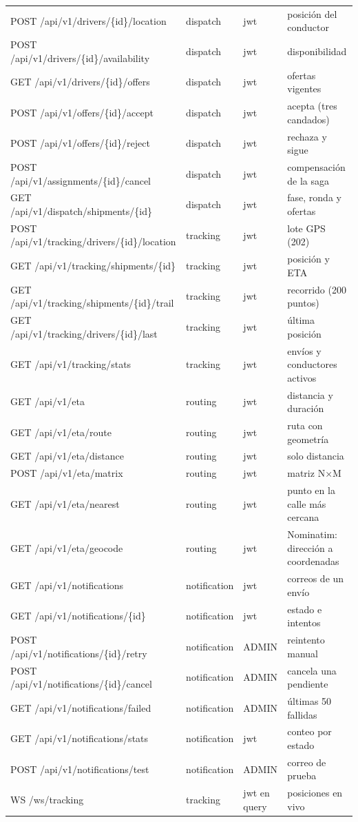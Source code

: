 \documentclass[conference]{IEEEtran}
\begin{document}
\begin{table}[!t]
\begin{tabular}{@{}L{6.4cm}L{2.2cm}L{1.6cm}L{5.2cm}@{}}
POST /api/v1/drivers/\{id\}/location & dispatch & jwt & posición del conductor\\
POST /api/v1/drivers/\{id\}/availability & dispatch & jwt & disponibilidad\\
GET /api/v1/drivers/\{id\}/offers & dispatch & jwt & ofertas vigentes\\
POST /api/v1/offers/\{id\}/accept & dispatch & jwt & acepta (tres candados)\\
POST /api/v1/offers/\{id\}/reject & dispatch & jwt & rechaza y sigue\\
POST /api/v1/assignments/\{id\}/cancel & dispatch & jwt & compensación de la saga\\
GET /api/v1/dispatch/shipments/\{id\} & dispatch & jwt & fase, ronda y ofertas\\
POST /api/v1/tracking/drivers/\{id\}/location & tracking & jwt & lote GPS (202)\\
GET /api/v1/tracking/shipments/\{id\} & tracking & jwt & posición y ETA\\
GET /api/v1/tracking/shipments/\{id\}/trail & tracking & jwt & recorrido (200 puntos)\\
GET /api/v1/tracking/drivers/\{id\}/last & tracking & jwt & última posición\\
GET /api/v1/tracking/stats & tracking & jwt & envíos y conductores activos\\
GET /api/v1/eta & routing & jwt & distancia y duración\\
GET /api/v1/eta/route & routing & jwt & ruta con geometría\\
GET /api/v1/eta/distance & routing & jwt & solo distancia\\
POST /api/v1/eta/matrix & routing & jwt & matriz N×M\\
GET /api/v1/eta/nearest & routing & jwt & punto en la calle más cercana\\
GET /api/v1/eta/geocode & routing & jwt & Nominatim: dirección a coordenadas\\
GET /api/v1/notifications & notification & jwt & correos de un envío\\
GET /api/v1/notifications/\{id\} & notification & jwt & estado e intentos\\
POST /api/v1/notifications/\{id\}/retry & notification & ADMIN & reintento manual\\
POST /api/v1/notifications/\{id\}/cancel & notification & ADMIN & cancela una pendiente\\
GET /api/v1/notifications/failed & notification & ADMIN & últimas 50 fallidas\\
GET /api/v1/notifications/stats & notification & jwt & conteo por estado\\
POST /api/v1/notifications/test & notification & ADMIN & correo de prueba\\
WS /ws/tracking & tracking & jwt en query & posiciones en vivo\\
\bottomrule
\end{tabular}
\end{table}
\end{document}
